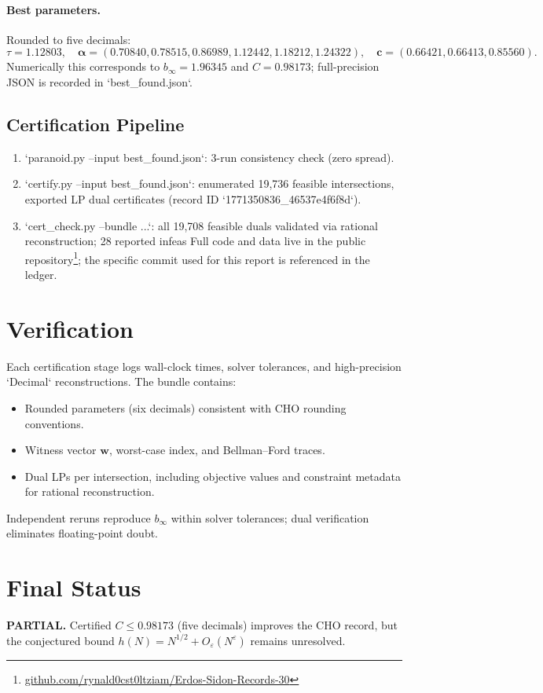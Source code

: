 \documentclass[11pt]{article}
\begin{document}
\paragraph{Best parameters.}
Rounded to five decimals:
\[
\tau = 1.12803,\quad \boldsymbol{\alpha} = (0.70840,0.78515,0.86989,1.12442,1.18212,1.24322),\quad \mathbf{c} = (0.66421,0.66413,0.85560).
\]
Numerically this corresponds to $b_\infty = 1.96345$ and $C = 0.98173$; full-precision JSON is recorded in `best_found.json`.

\subsection*{Certification Pipeline}
\begin{enumerate}
  \item `paranoid.py --input best_found.json`: 3-run consistency check (zero spread).
  \item `certify.py --input best_found.json`: enumerated 19,736 feasible intersections, exported LP dual certificates (record ID `1771350836_46537e4f6f8d`).
  \item `cert_check.py --bundle ...`: all 19,708 feasible duals validated via rational reconstruction; 28 reported infeas
Full code and data live in the public repository\footnote{\href{https://github.com/rynald0cst0ltziam/Erdos-Sidon-Records-30}{github.com/rynald0cst0ltziam/Erdos-Sidon-Records-30}}; the specific commit used for this report is referenced in the ledger.
\end{enumerate}

\section*{Verification}
Each certification stage logs wall-clock times, solver tolerances, and high-precision `Decimal` reconstructions. The bundle contains:
\begin{itemize}
  \item Rounded parameters (six decimals) consistent with CHO rounding conventions.
  \item Witness vector $\mathbf{w}$, worst-case index, and Bellman--Ford traces.
  \item Dual LPs per intersection, including objective values and constraint metadata for rational reconstruction.
\end{itemize}
Independent reruns reproduce $b_\infty$ within solver tolerances; dual verification eliminates floating-point doubt.

\section*{Final Status}
\textbf{PARTIAL.} Certified $C \le 0.98173$ (five decimals) improves the CHO record, but the conjectured bound $h(N) = N^{1/2} + O_\varepsilon(N^\varepsilon)$ remains unresolved.
\end{document}
